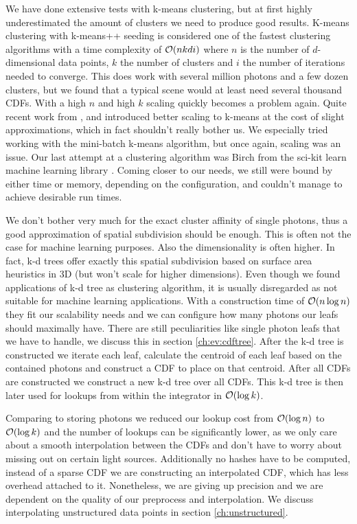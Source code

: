 We have done extensive tests with k-means clustering, but at first highly underestimated the amount of clusters we need to produce good results. K-means clustering with k-means++ seeding \cite{DBLP:conf/soda/ArthurV07} is considered one of the fastest clustering algorithms with a time complexity of $\mathcal{O}(nkdi)$ where $n$ is the number of $d$-dimensional data points, $k$ the number of clusters and $i$ the number of iterations needed to converge. This does work with several million photons and a few dozen clusters, but we found that a typical scene would at least need several thousand CDFs. With a high $n$ and high $k$ scaling quickly becomes a problem again. Quite recent work from \cite{DBLP:conf/kse/HieuM14}, \cite{DBLP:journals/tpds/XuQLMLL14} and \cite{DBLP:conf/www/Sculley10} introduced better scaling to k-means at the cost of slight approximations, which in fact shouldn't really bother us. We especially tried working with the mini-batch k-means algorithm, but once again, scaling was an issue. Our last attempt at a clustering algorithm was Birch \cite{DBLP:conf/sigmod/ZhangRL96} from the sci-kit learn machine learning library \cite{scikit-learn}. Coming closer to our needs, we still were bound by either time or memory, depending on the configuration, and couldn't manage to achieve desirable run times.

We don't bother very much for the exact cluster affinity of single photons, thus a good approximation of spatial subdivision should be enough. This is often not the case for machine learning purposes. Also the dimensionality is often higher. In fact, k-d trees offer exactly this spatial subdivision based on surface area heuristics in 3D (but won't scale for higher dimensions). Even though we found applications of k-d tree as clustering algorithm, it is usually disregarded as not suitable for machine learning applications. With a construction time of $\mathcal{O}(n \log n)$ they fit our scalability needs and we can configure how many photons our leafs should maximally have. There are still peculiarities like single photon leafs that we have to handle, we discuss this in section \ref{ch:ev:cdftree}. After the k-d tree is constructed we iterate each leaf, calculate the centroid of each leaf based on the contained photons and construct a CDF to place on that centroid. After all CDFs are constructed we construct a new k-d tree over all CDFs. This k-d tree is then later used for lookups from within the integrator in $\mathcal{O}(\log k)$.

Comparing to storing photons we reduced our lookup cost from $\mathcal{O}(\log n)$ to $\mathcal{O}(\log k)$ and the number of lookups can be significantly lower, as we only care about a smooth interpolation between the CDFs and don't have to worry about missing out on certain light sources. Additionally no hashes have to be computed, instead of a sparse CDF we are constructing an interpolated CDF, which has less overhead attached to it. Nonetheless, we are giving up precision and we are dependent on the quality of our preprocess and interpolation. We discuss interpolating unstructured data points in section \ref{ch:unstructured}.


